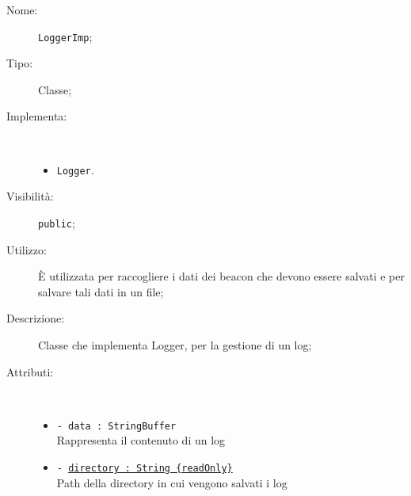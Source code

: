 \documentclass[../DefinizioneDiProdotto.tex]{subfiles}
\begin{document}
    \begin{description}
\item[Nome:] \texttt{LoggerImp};
\item[Tipo:] Classe;
\item[Implementa:] \
\begin{itemize}
\item \texttt{Logger}.

\end{itemize}
\item[Visibilità:] \texttt{public};
\item[Utilizzo:] È utilizzata per raccogliere i dati dei beacon che devono essere salvati e per salvare tali dati in un file;
\item[Descrizione:] Classe che implementa Logger, per la gestione di un log;
\item[Attributi:] \
\begin{itemize}
\item \texttt{- data : StringBuffer}\\
Rappresenta il contenuto di un log

\item \texttt{- \underline{directory : String \{readOnly\}}}\\
Path della directory in cui vengono salvati i log


\end{itemize}
\end{description}
\end{document}
